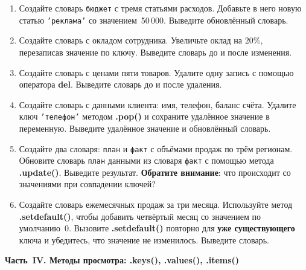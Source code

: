 \documentclass[a4,12pt]{article}
\theoremstyle{remark}
\begin{document}
\begin{enumerate}[resume]

    \item Создайте словарь \texttt{бюджет} с тремя статьями расходов. Добавьте в него новую статью \texttt{'реклама'} со значением~50\,000. Выведите обновлённый словарь.

    \item Создайте словарь с окладом сотрудника. Увеличьте оклад на $20\%$, перезаписав значение по ключу. Выведите словарь до и после изменения.

    \item Создайте словарь с ценами пяти товаров. Удалите одну запись с помощью оператора \textbf{del}. Выведите словарь до и после удаления.

    \item Создайте словарь с данными клиента: имя, телефон, баланс счёта. Удалите ключ \texttt{'телефон'} методом \textbf{.pop()} и сохраните удалённое значение в переменную. Выведите удалённое значение и обновлённый словарь.

    \item Создайте два словаря: \texttt{план} и \texttt{факт} с объёмами продаж по трём регионам. Обновите словарь \texttt{план} данными из словаря \texttt{факт} с помощью метода \textbf{.update()}. Выведите результат. \textbf{Обратите внимание}: что происходит со значениями при совпадении ключей?

    \item Создайте словарь ежемесячных продаж за три месяца. Используйте метод \textbf{.setdefault()}, чтобы добавить четвёртый месяц со значением по умолчанию~0. Вызовите \textbf{.setdefault()} повторно для \textbf{уже существующего} ключа и убедитесь, что значение не изменилось. Выведите словарь.

\end{enumerate}

\bigskip
\noindent\textbf{Часть~IV. Методы просмотра: .keys(), .values(), .items()}
\end{document}
